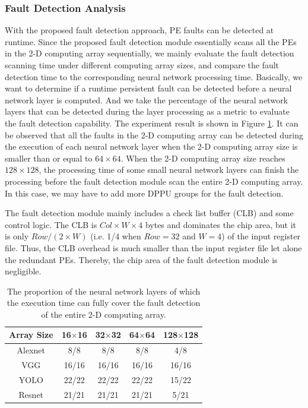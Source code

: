 \subsubsection{Fault Detection Analysis}
With the proposed fault detection approach, PE faults can be detected at runtime. Since the proposed fault detection module essentially scans all the PEs in the 2-D computing array sequentially, we mainly evaluate the fault detection scanning time under different computing array sizes, and compare the fault detection time to the corresponding neural network processing time. Basically, we want to determine if a runtime persistent fault can be detected before a neural network layer is computed. And we take the percentage of the neural network layers that can be detected during the layer processing as a metric to evaluate the fault detection capability. The experiment result is shown in Figure \ref{detection}. It can be observed that all the faults in the 2-D computing array can be detected during the execution of each neural network layer when the 2-D computing array size is smaller than or equal to $64 \times 64$. When the 2-D computing array size reaches $128 \times 128$, the processing time of some small neural network layers can finish the processing before the fault detection module scan the entire 2-D computing array. In this case, we may have to add more DPPU groups for the fault detection. 

The fault detection module mainly includes a check list buffer (CLB) and some control logic. The CLB is $Col \times W \times 4$ bytes and dominates the chip area, but it is only $Row/(2\times W)$ (i.e. 1/4 when $Row = 32$ and $W = 4$) of the input register file. Thus, the CLB overhead is much smaller than the input register file let alone the redundant PEs. Thereby, the chip area of the fault detection module is negligible.


\begin{table}[]
\setlength{\abovedisplayskip}{3pt}
\setlength{\belowdisplayskip}{3pt}
\centering
\setlength{\tabcolsep}{4mm}
\caption{The proportion of the neural network layers of which the execution time can fully cover the fault detection of the entire 2-D computing array.}
\begin{tabular}{ccccc}
\hline
\hline
 Array Size       & 16$\times$16  & 32$\times$32  & 64$\times$64  & 128$\times$128 \\     \hline
Alexnet & 8/8           & 8/8           & 8/8           & 4/8     \\            
VGG     & 16/16         & 16/16         & 16/16         & 16/16   \\            
YOLO    & 22/22         & 22/22         & 22/22         & 15/22   \\            
Resnet  & 21/21         & 21/21         & 21/21         & 5/21    \\            \hline
\end{tabular}
\label{detection}
\vspace{-1em}
\end{table}

